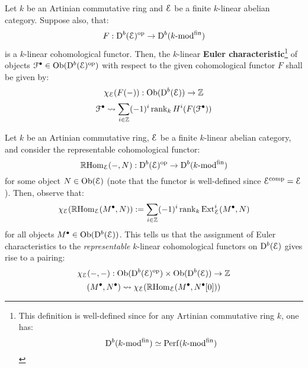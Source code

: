             \begin{definition} \label{def: euler_characteristics}
                Let $k$ be an Artinian commutative ring and $\mathcal{E}$ be a finite $k$-linear abelian category. Suppose also, that:
                    $$F: \mathrm{D}^b(\mathcal{E})^{\mathrm{op}} \to \mathrm{D}^b(k\text{-}\mathrm{mod}^{\mathrm{fin}})$$
                is a $k$-linear cohomological functor. Then, the $k$-linear \textbf{Euler characteristic}\footnote{This definition is well-defined since for any Artinian commutative ring $k$, one has:
                    $$\mathrm{D}^b(k\text{-}\mathrm{mod}^{\mathrm{fin}}) \simeq \mathrm{Perf}(k\text{-}\mathrm{mod}^{\mathrm{fin}})$$} of objects $\mathcal{F}^{\bullet} \in \mathrm{Ob}(\mathrm{D}^b(\mathcal{E})^{\mathrm{op}})$ with respect to the given cohomological functor $F$ shall be given by:
                    $$\chi_{\mathcal{E}}(F(-)): \mathrm{Ob}(\mathrm{D}^b(\mathcal{E})) \to \mathbb{Z}$$
                    $$\mathcal{F}^{\bullet} \leadsto \sum_{i \in \mathbb{Z}} (-1)^i \operatorname{rank}_k H^i(F(\mathcal{F}^{\bullet}))$$
            \end{definition}
            \begin{remark} \label{remark: euler_characteristics_as_bilinear_forms}
                Let $k$ be an Artinian commutative ring, $\mathcal{E}$ be a finite $k$-linear abelian category, and consider the representable cohomological functor:
                    $$\mathbb{R}\mathrm{Hom}_{\mathcal{E}}(-, N): \mathrm{D}^b(\mathcal{E})^{\mathrm{op}} \to \mathrm{D}^b(k\text{-}\mathrm{mod}^{\mathrm{fin}})$$
                for some object $N \in \mathrm{Ob}(\mathcal{E})$ (note that the functor is well-defined since $\mathcal{E}^{\mathrm{comp}} = \mathcal{E}$). Then, observe that:
                    $$\chi_{\mathcal{E}}(\mathbb{R}\mathrm{Hom}_{\mathcal{E}}(M^{\bullet}, N)) := \sum_{i \in \mathbb{Z}} (-1)^i \operatorname{rank}_k \mathrm{Ext}^i_{\mathcal{E}}(M^{\bullet}, N)$$
                for all objects $M^{\bullet} \in \mathrm{Ob}(\mathrm{D}^b(\mathcal{E}))$. This tells us that the assignment of Euler characteristics to the \textit{representable} $k$-linear cohomological functors on $\mathrm{D}^b(\mathcal{E})$ gives rise to a pairing:
                    $$\chi_{\E}(-, -): \Ob(\rmD^b(\E)^{\op}) \x \Ob(\rmD^b(\E)) \to \Z$$
                    $$(M^{\bullet}, N^{\bullet}) \leadsto \chi_{\mathcal{E}}(\mathbb{R}\mathrm{Hom}_{\mathcal{E}}(M^{\bullet}, N^{\bullet}[0]))$$
            \end{remark}
